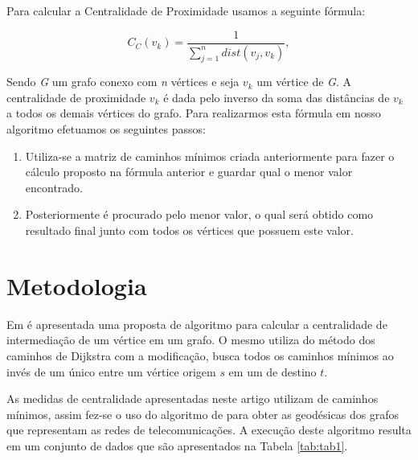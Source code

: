 \documentclass[12pt]{article}
\begin{document}
Para calcular a Centralidade de Proximidade usamos a seguinte fórmula:
\begin{center}
\begin{equation}
C_C(v_k)=\frac{1}{\sum\limits_{j = 1}^n dist(v_j,v_k)},
\end{equation}
\end{center}
Sendo {\it G} um grafo conexo com {\it n} vértices e seja $v_k$ um vértice de {\it G}. A centralidade de proximidade $v_k$ é dada pelo inverso da soma das distâncias de $v_k$ a todos os demais vértices do grafo.
Para realizarmos esta fórmula em nosso algoritmo efetuamos os seguintes passos:
\begin{enumerate}
\item Utiliza-se a matriz de caminhos mínimos criada anteriormente para fazer o cálculo proposto na fórmula anterior e guardar qual o menor valor encontrado.
\item Posteriormente é procurado pelo menor valor, o qual será obtido como resultado final junto com todos os vértices que possuem este valor.
\end{enumerate}

\section{Metodologia}\label{sec:met}
Em \cite{Brandes01afaster} é apresentada uma proposta de algoritmo para calcular a centralidade de intermediação de um vértice em um grafo. O mesmo utiliza do método dos caminhos de Dijkstra com a modificação, busca todos os caminhos mínimos ao invés de um único entre um vértice origem $s$ em um de destino $t$.

As medidas de centralidade apresentadas neste artigo utilizam de caminhos mínimos, assim fez-se o uso do algoritmo de \cite{Brandes01afaster} para obter as geodésicas dos grafos que representam as redes de telecomunicações.
A execução deste algoritmo resulta em um conjunto de dados que são apresentados na Tabela \ref{tab:tab1}. 
\end{document}
